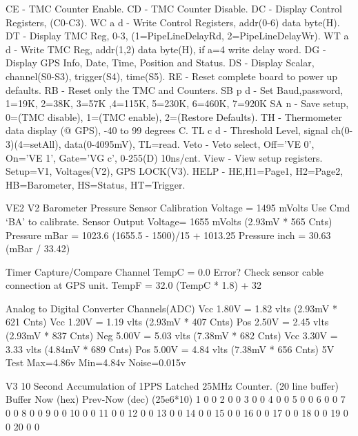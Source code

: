 \documentclass[letterpaper,10pt,english]{sphinxmanual}
\begin{document}
CE     - TMC Counter Enable.
CD     - TMC Counter Disable.
DC     - Display Control Registers, (C0-C3).
WC a d - Write   Control Registers, addr(0-6) data byte(H).
DT     - Display TMC Reg, 0-3, (1=PipeLineDelayRd, 2=PipeLineDelayWr).
WT a d - Write   TMC Reg, addr(1,2) data byte(H), if a=4 write delay word.
DG     - Display GPS Info, Date, Time, Position and Status.
DS     - Display Scalar, channel(S0-S3), trigger(S4), time(S5).
RE     - Reset complete board to power up defaults.
RB     - Reset only the TMC and Counters.
SB p d - Set Baud,password, 1=19K, 2=38K, 3=57K ,4=115K, 5=230K, 6=460K, 7=920K
SA n   - Save setup, 0=(TMC disable), 1=(TMC enable), 2=(Restore Defaults).
TH     - Thermometer data display (@ GPS), -40 to 99 degrees C.
TL c d - Threshold Level, signal ch(0-3)(4=setAll), data(0-4095mV), TL=read.
Veto   - Veto select, Off='VE 0', On='VE 1', Gate='VG c', 0-255(D) 10ns/cnt.
View   - View setup registers. Setup=V1, Voltages(V2), GPS LOCK(V3).
HELP   - HE,H1=Page1, H2=Page2, HB=Barometer, HS=Status, HT=Trigger.

VE2
V2
Barometer Pressure Sensor
Calibration Voltage  = 1495 mVolts   Use Cmd `BA' to calibrate.
Sensor Output Voltage= 1655 mVolts   (2.93mV *  565 Cnts)
Pressure mBar        = 1023.6        (1655.5 - 1500)/15 + 1013.25
Pressure inch        = 30.63         (mBar / 33.42)

Timer Capture/Compare Channel
TempC  = 0.0     Error?  Check sensor cable connection at GPS unit.
TempF  = 32.0    (TempC * 1.8) + 32

Analog to Digital Converter Channels(ADC)
Vcc 1.80V = 1.82 vlts     (2.93mV *  621 Cnts)
Vcc 1.20V = 1.19 vlts     (2.93mV *  407 Cnts)
Pos 2.50V = 2.45 vlts     (2.93mV *  837 Cnts)
Neg 5.00V = 5.03 vlts     (7.38mV *  682 Cnts)
Vcc 3.30V = 3.33 vlts     (4.84mV *  689 Cnts)
Pos 5.00V = 4.84 vlts     (7.38mV *  656 Cnts)
5V Test    Max=4.86v    Min=4.84v    Noise=0.015v

V3
10 Second Accumulation of 1PPS Latched 25MHz Counter. (20 line buffer)
Buffer     Now (hex)     Prev-Now (dec) (25e6*10)
1              0               0
2              0               0
3              0               0
4              0               0
5              0               0
6              0               0
7              0               0
8              0               0
9              0               0
10              0               0
11              0               0
12              0               0
13              0               0
14              0               0
15              0               0
16              0               0
17              0               0
18              0               0
19              0               0
20              0               0
\end{document}
